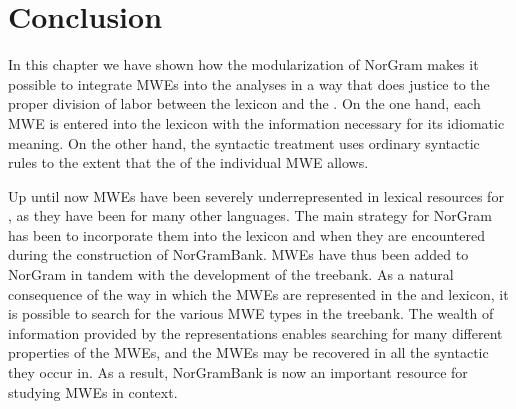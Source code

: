 \documentclass[output=paper]{langsci/langscibook}
\begin{document}

\section{Conclusion}\label{dyv:sec:mweiness:conc}

In this chapter we have shown how the modularization of NorGram makes it possible to integrate MWEs into the  analyses in a way that does justice to the proper division of labor between the lexicon and the .
On the one hand, each MWE is entered into the lexicon with the information necessary for its idiomatic meaning.
On the other hand, the syntactic treatment uses ordinary syntactic rules to the extent that the  of the individual MWE allows.

Up until now MWEs have been severely underrepresented in lexical resources for , as they have been for many other languages.
The main strategy for NorGram has been to incorporate them into the lexicon and  when they are encountered during the construction of NorGramBank.
MWEs have thus been added to NorGram in tandem with the development of the treebank.
As a natural consequence of the way in which the MWEs are represented in the  and lexicon, it is possible to search for the various MWE types in the treebank.
The wealth of information provided by the  representations enables searching for many different properties of the MWEs, and the MWEs may be recovered in all the syntactic  they occur in.
As a result, NorGramBank is now an important resource for studying  MWEs in context.
\end{document}

